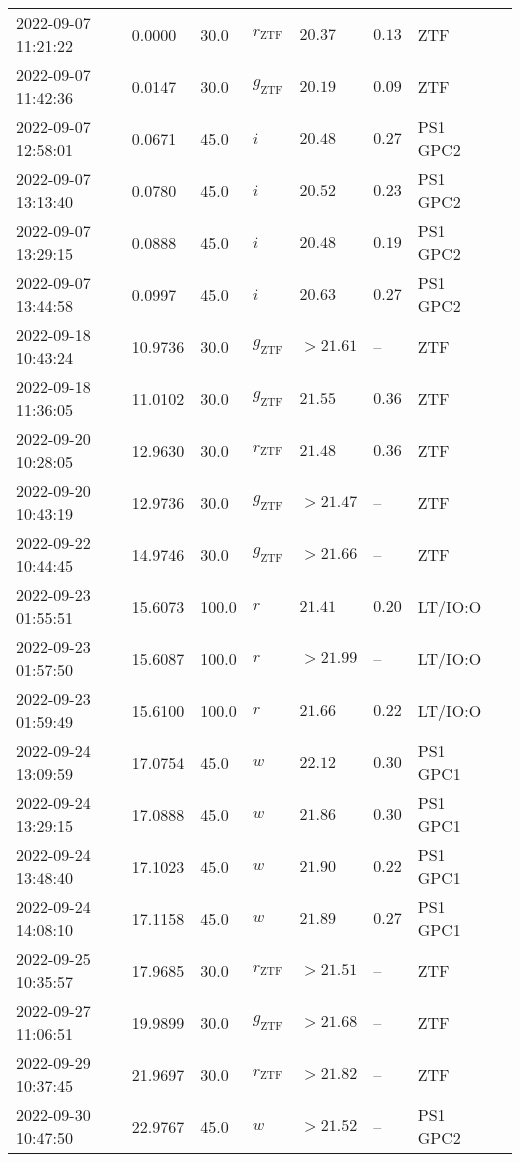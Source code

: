 \documentclass{nature_plusfigure}
\begin{document}
\begin{supplement}
\begin{center}
\begin{longtable}{llllllll}
2022-09-07 11:21:22 & 0.0000 & 30.0 & ${r}_\mathrm{ZTF}$ & $20.37$ & $0.13$ & ZTF &  \\ 
2022-09-07 11:42:36 & 0.0147 & 30.0 & ${g}_\mathrm{ZTF}$ & $20.19$ & $0.09$ & ZTF &  \\ 
2022-09-07 12:58:01 & 0.0671 & 45.0 & $i$ & $20.48$ & $0.27$ & PS1 GPC2 &  \\ 
2022-09-07 13:13:40 & 0.0780 & 45.0 & $i$ & $20.52$ & $0.23$ & PS1 GPC2 &  \\ 
2022-09-07 13:29:15 & 0.0888 & 45.0 & $i$ & $20.48$ & $0.19$ & PS1 GPC2 &  \\ 
2022-09-07 13:44:58 & 0.0997 & 45.0 & $i$ & $20.63$ & $0.27$ & PS1 GPC2 &  \\ 
2022-09-18 10:43:24 & 10.9736 & 30.0 & ${g}_\mathrm{ZTF}$ & $>21.61$ & -- & ZTF &  \\ 
2022-09-18 11:36:05 & 11.0102 & 30.0 & ${g}_\mathrm{ZTF}$ & $21.55$ & $0.36$ & ZTF &  \\ 
2022-09-20 10:28:05 & 12.9630 & 30.0 & ${r}_\mathrm{ZTF}$ & $21.48$ & $0.36$ & ZTF &  \\ 
2022-09-20 10:43:19 & 12.9736 & 30.0 & ${g}_\mathrm{ZTF}$ & $>21.47$ & -- & ZTF &  \\ 
2022-09-22 10:44:45 & 14.9746 & 30.0 & ${g}_\mathrm{ZTF}$ & $>21.66$ & -- & ZTF &  \\ 
2022-09-23 01:55:51 & 15.6073 & 100.0 & $r$ & $21.41$ & $0.20$ & LT/IO:O &  \\ 
2022-09-23 01:57:50 & 15.6087 & 100.0 & $r$ & $>21.99$ & -- & LT/IO:O &  \\ 
2022-09-23 01:59:49 & 15.6100 & 100.0 & $r$ & $21.66$ & $0.22$ & LT/IO:O &  \\ 
2022-09-24 13:09:59 & 17.0754 & 45.0 & $w$ & $22.12$ & $0.30$ & PS1 GPC1 &  \\ 
2022-09-24 13:29:15 & 17.0888 & 45.0 & $w$ & $21.86$ & $0.30$ & PS1 GPC1 &  \\ 
2022-09-24 13:48:40 & 17.1023 & 45.0 & $w$ & $21.90$ & $0.22$ & PS1 GPC1 &  \\ 
2022-09-24 14:08:10 & 17.1158 & 45.0 & $w$ & $21.89$ & $0.27$ & PS1 GPC1 &  \\ 
2022-09-25 10:35:57 & 17.9685 & 30.0 & ${r}_\mathrm{ZTF}$ & $>21.51$ & -- & ZTF &  \\ 
2022-09-27 11:06:51 & 19.9899 & 30.0 & ${g}_\mathrm{ZTF}$ & $>21.68$ & -- & ZTF &  \\ 
2022-09-29 10:37:45 & 21.9697 & 30.0 & ${r}_\mathrm{ZTF}$ & $>21.82$ & -- & ZTF &  \\ 
2022-09-30 10:47:50 & 22.9767 & 45.0 & $w$ & $>21.52$ & -- & PS1 GPC2 &  \\ 

\end{longtable}
\end{center}
\end{supplement}
\end{document}
